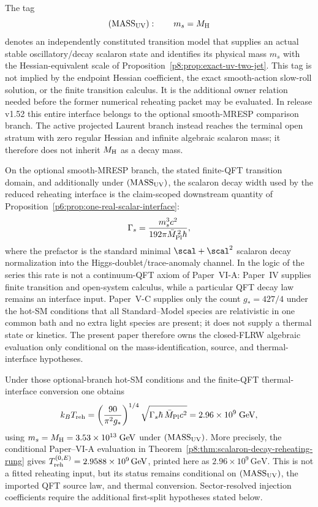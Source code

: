 \documentclass[12pt,a4paper]{article}
\begin{document}
\begin{definition}
\label{p8:def:mass-uv-interface}
The tag
\begin{equation}
\label{p8:eq:mass-uv-interface}
 (\mathrm{MASS}_{\rm UV}):\qquad m_s=M_{\rm H}
\end{equation}
denotes an independently constituted transition model that supplies an actual
stable oscillatory/decay scalaron state and identifies its physical mass
\(m_s\) with the Hessian-equivalent scale of
Proposition~\ref{p8:prop:exact-uv-two-jet}.  This tag is not implied by the
endpoint Hessian coefficient, the exact smooth-action slow-roll solution, or
the finite transition calculus.  It is the additional owner relation needed
before the former numerical reheating packet may be evaluated.  In release
v1.52 this entire interface belongs to the optional smooth-MRESP comparison
branch.  The active projected Laurent branch instead reaches the terminal
open stratum with zero regular Hessian and infinite algebraic scalaron mass;
it therefore does not inherit \(M_{\rm H}\) as a decay mass.
\end{definition}

On the optional smooth-MRESP branch, the stated finite-QFT transition domain,
and additionally under
\((\mathrm{MASS}_{\rm UV})\), the scalaron decay width used by the reduced
reheating interface is the claim-scoped downstream quantity of
Proposition~\ref{p6:prop:one-real-scalar-interface}:
\[
\Gamma_s = \frac{m_s^3 c^2}{192\pi \bar M_{\rm Pl}^{\,2}\hbar},
\]
where the prefactor is the standard minimal $\scal+\scal^2$ scalaron decay
normalization into the Higgs-doublet/trace-anomaly channel.  In the logic of
the series this rate is not a continuum-QFT axiom of Paper~VI-A: Paper~IV
supplies finite transition and open-system calculus, while a particular QFT
decay law remains an interface input.  Paper~V-C supplies
only the count \(g_*=427/4\) under the hot-SM conditions that all Standard--Model
species are relativistic in one common bath and no extra light species are
present; it does not supply a thermal state or kinetics.  The present paper
therefore owns the closed-FLRW algebraic evaluation only conditional on the
mass-identification, source, and thermal-interface hypotheses.

Under those optional-branch hot-SM conditions and the finite-QFT
thermal-interface conversion
one obtains
\[
k_B T_{\mathrm{reh}}
=
\left( \frac{90}{\pi^2 g_*} \right)^{1/4}
\sqrt{\Gamma_s \hbar\, \bar M_{\rm Pl} c^2}
=
2.96 \times 10^9\;\mathrm{GeV},
\]
using $m_s=M_{\rm H}=3.53 \times 10^{13}\;\text{GeV}$ under
\((\mathrm{MASS}_{\rm UV})\).  More precisely, the conditional Paper--VI-A evaluation
in Theorem~\ref{p8:thm:scalaron-decay-reheating-rung} gives
$T_{\rm reh}^{(0,E)}=2.9588\times10^9\,\mathrm{GeV}$, printed here as
$2.96\times10^9\,\mathrm{GeV}$.  This is not a fitted reheating input, but its
status remains conditional on \((\mathrm{MASS}_{\rm UV})\), the imported QFT
source law, and thermal conversion.  Sector-resolved injection coefficients require the additional
first-split hypotheses stated below.
\end{document}
